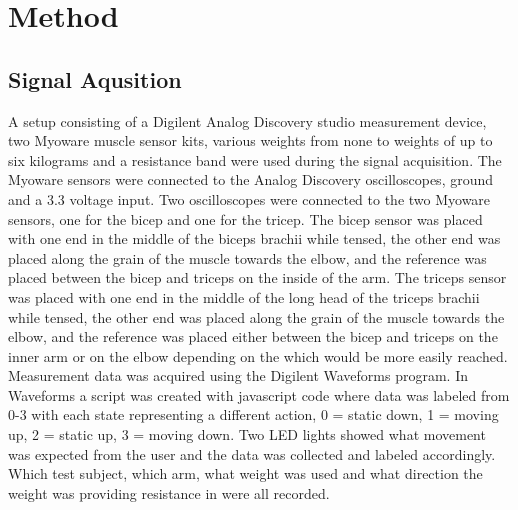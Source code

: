 \section{Method}
\label{section:method}



\subsection{Signal Aqusition}
A setup consisting of a Digilent Analog Discovery studio measurement device, two Myoware muscle sensor 
kits, various weights from none to weights of up to six kilograms and a resistance 
band were used during the signal acquisition. The Myoware sensors were connected to the Analog Discovery 
oscilloscopes, ground and a 3.3 voltage input. Two oscilloscopes were connected to the two Myoware 
sensors, one for the bicep and one for the tricep. The bicep sensor was placed with one end in the 
middle of the biceps brachii while tensed, the other end was placed along the grain of the muscle 
towards the elbow, and the reference was placed between the bicep and triceps on the inside of the arm. 
The triceps sensor was placed with one end in the middle of the long head of the triceps brachii while 
tensed, the other end was placed along the grain of the muscle towards the elbow, and the reference was 
placed either between the bicep and triceps on the inner arm or on the elbow depending on the which would 
be more easily reached. Measurement data was acquired using the Digilent Waveforms program. In Waveforms a 
script was created with javascript code where data was labeled from 0-3 with each state representing a 
different action, 0 = static down, 1 = moving up, 2 = static up, 3 = moving down. Two LED lights showed what 
movement was expected from the user and the data was collected and labeled accordingly. Which test subject, 
which arm, what weight was used and what direction the weight was providing resistance in were all recorded.


